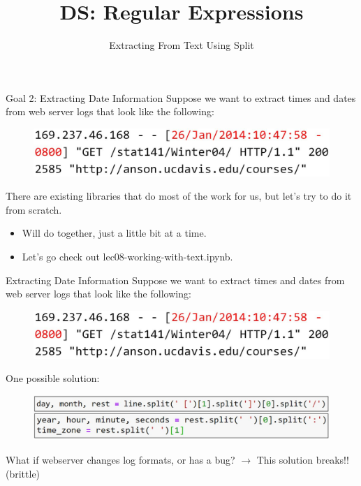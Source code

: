\documentclass[aspectratio=169]{../latex_main/tntbeamer}  %
\title[Introduction]{DS: Regular Expressions}
\subtitle{Extracting From Text Using Split}
\begin{document}
	
	\maketitle
	\begin{frame}{Goal 2: Extracting Date Information}
	    Suppose we want to extract times and dates from web server logs that look like the following:\\
	    \begin{figure}
	        \centering
	        \includegraphics[scale=.45]{Bild5}\\
	    \end{figure}
	    \pause
	    
	    There are existing libraries that do most of the work for us, but let’s try to do it from scratch.
	    \begin{itemize}
	        \item Will do together, just a little bit at a time.
	        \item Let’s go check out lec08-working-with-text.ipynb.
	    \end{itemize}
	\end{frame}
	
	
	
	\begin{frame}{Extracting Date Information}
	    Suppose we want to extract times and dates from web server logs that look like the following:\\
	    \begin{figure}
	        \centering
	        \includegraphics[scale=.35]{Bild5}\\
	    \end{figure}
	    \pause
	    
	    One possible solution:
	    \begin{figure}
	        \centering
	        \includegraphics[scale=.35]{Bild6}
	    \end{figure}
	    \pause
	    What if webserver changes log formats, or has a bug? $\rightarrow$ This solution breaks!! (brittle)

	\end{frame}
\end{document}
